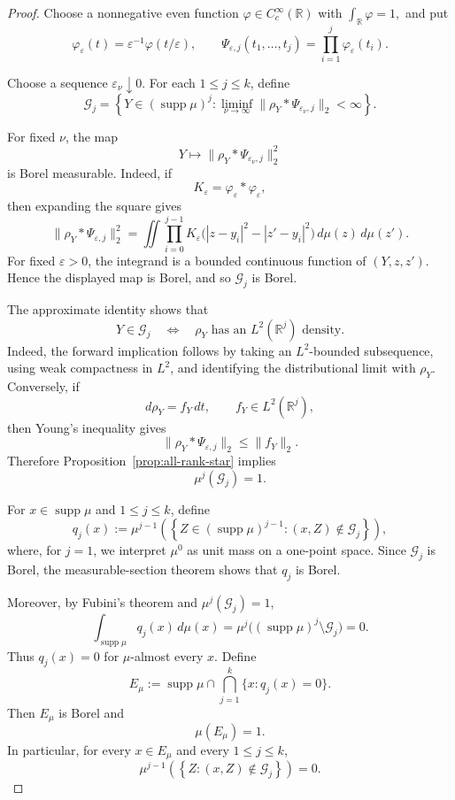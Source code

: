 \documentclass[11pt]{article}
\theoremstyle{remark}
\newcommand{\supp}{\operatorname{supp}}
\numberwithin{equation}{section}
\newcommand{\1}{\mathbf 1}
\begin{document}
\begin{proof}
Choose a nonnegative even function
\(\varphi\in C_c^\infty(\mathbb R)\) with
$
\int_{\mathbb R}\varphi=1,$
and put
\[
\varphi_\varepsilon(t)
=
\varepsilon^{-1}\varphi(t/\varepsilon),
\qquad
\Psi_{\varepsilon,j}(t_1,\ldots,t_j)
=
\prod_{i=1}^j\varphi_\varepsilon(t_i).
\]

Choose a sequence \(\varepsilon_\nu\downarrow0\). For each
\(1\leq j\leq k\), define
\[
\mathcal G_j
=
\left\{
Y\in(\supp\mu)^j:
\liminf_{\nu\to\infty}
\|\rho_Y*\Psi_{\varepsilon_\nu,j}\|_2<\infty
\right\}.
\]

For fixed \(\nu\), the map
\[
Y\longmapsto
\|\rho_Y*\Psi_{\varepsilon_\nu,j}\|_2^2
\]
is Borel measurable. Indeed, if
\[
K_\varepsilon
=
\varphi_\varepsilon*\varphi_\varepsilon,
\]
then expanding the square gives
\[
\|\rho_Y*\Psi_{\varepsilon,j}\|_2^2
=
\iint
\prod_{i=0}^{j-1}
K_\varepsilon
\bigl(
|z-y_i|^2-|z'-y_i|^2
\bigr)
\,d\mu(z)\,d\mu(z').
\]
For fixed \(\varepsilon>0\), the integrand is a bounded continuous
function of \((Y,z,z')\). Hence the displayed map is Borel, and so
\(\mathcal G_j\) is Borel.

The approximate identity shows that
\[
Y\in\mathcal G_j
\quad\Longleftrightarrow\quad
\rho_Y
\text{ has an }L^2(\mathbb R^j)\text{ density}.
\]
Indeed, the forward implication follows by taking an
\(L^2\)-bounded subsequence, using weak compactness in \(L^2\), and
identifying the distributional limit with \(\rho_Y\). Conversely, if
\[
d\rho_Y=f_Y\,dt,
\qquad
f_Y\in L^2(\mathbb R^j),
\]
then Young's inequality gives
\[
\|\rho_Y*\Psi_{\varepsilon,j}\|_2
\leq
\|f_Y\|_2.
\]
Therefore Proposition~\ref{prop:all-rank-star} implies
\[
\mu^j(\mathcal G_j)=1.
\]








For \(x\in\supp\mu\) and \(1\leq j\leq k\), define
\[
q_j(x)
:=
\mu^{j-1}
\left(
\left\{
Z\in(\supp\mu)^{j-1}:
(x,Z)\notin\mathcal G_j
\right\}
\right),
\]
where, for \(j=1\), we interpret \(\mu^0\) as unit mass on a
one-point space. Since \(\mathcal G_j\) is Borel, the measurable-section
theorem shows that \(q_j\) is Borel.

Moreover, by Fubini's theorem and \(\mu^j(\mathcal G_j)=1\),
\[
\int_{\supp\mu} q_j(x)\,d\mu(x)
=
\mu^j\bigl((\supp\mu)^j\setminus\mathcal G_j\bigr)
=
0.
\]
Thus \(q_j(x)=0\) for \(\mu\)-almost every \(x\). Define
\[
E_\mu
:=
\supp\mu\cap
\bigcap_{j=1}^k\{x:q_j(x)=0\}.
\]
Then \(E_\mu\) is Borel and
\[
\mu(E_\mu)=1.
\]
In particular, for every \(x\in E_\mu\) and every \(1\leq j\leq k\),
\begin{equation}
\mu^{j-1}
\left(
\left\{
Z:(x,Z)\notin\mathcal G_j
\right\}
\right)
=0.
\label{eq:salem-good-fixed-pin}
\end{equation}


\end{proof}
\end{document}
